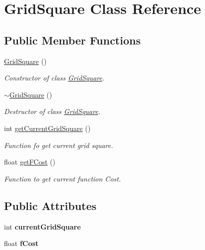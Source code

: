 \hypertarget{class_grid_square}{}\section{Grid\+Square Class Reference}
\label{class_grid_square}
\subsection*{Public Member Functions}
\begin{DoxyCompactItemize}
\item 
\hyperlink{class_grid_square_a88fe5e8a65dec8e59dde719e4a99b043}{Grid\+Square} ()
\begin{DoxyCompactList}\small\item\em Constructor of class \hyperlink{class_grid_square}{Grid\+Square}. \end{DoxyCompactList}\item 
\hyperlink{class_grid_square_a59667a543b4501774304ea25d8cd5589}{$\sim$\+Grid\+Square} ()
\begin{DoxyCompactList}\small\item\em Destructor of class \hyperlink{class_grid_square}{Grid\+Square}. \end{DoxyCompactList}\item 
int \hyperlink{class_grid_square_acea2649a57dd575402c2366de18cd9a8}{get\+Current\+Grid\+Square} ()
\begin{DoxyCompactList}\small\item\em Function fo get current grid square. \end{DoxyCompactList}\item 
float \hyperlink{class_grid_square_a6e82cc70c531d6a2fede8dadb3cd1e02}{get\+F\+Cost} ()
\begin{DoxyCompactList}\small\item\em Function to get current function Cost. \end{DoxyCompactList}\end{DoxyCompactItemize}
\subsection*{Public Attributes}
\begin{DoxyCompactItemize}
\item 
\mbox{\label{class_grid_square_af62396d0127126d7f95a81f81f4bc833}} 
int {\bfseries current\+Grid\+Square}
\item 
\mbox{\label{class_grid_square_a9d04f5503abd3663e7496dc6c3a702c0}} 
float {\bfseries f\+Cost}
\end{DoxyCompactItemize}


